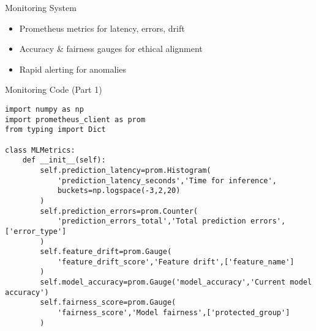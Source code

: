 \documentclass[aspectratio=169]{beamer}
\begin{document}

\begin{frame}{Monitoring System}


\begin{itemize}
\item Prometheus metrics for latency, errors, drift
\item Accuracy \& fairness gauges for ethical alignment
\item Rapid alerting for anomalies
\end{itemize}
\end{frame}


\begin{frame}[fragile]{Monitoring Code (Part 1)}
\begin{verbatim}
import numpy as np
import prometheus_client as prom
from typing import Dict

class MLMetrics:
    def __init__(self):
        self.prediction_latency=prom.Histogram(
            'prediction_latency_seconds','Time for inference',
            buckets=np.logspace(-3,2,20)
        )
        self.prediction_errors=prom.Counter(
            'prediction_errors_total','Total prediction errors',['error_type']
        )
        self.feature_drift=prom.Gauge(
            'feature_drift_score','Feature drift',['feature_name']
        )
        self.model_accuracy=prom.Gauge('model_accuracy','Current model accuracy')
        self.fairness_score=prom.Gauge(
            'fairness_score','Model fairness',['protected_group']
        )
\end{verbatim}
\end{frame}
\end{document}
